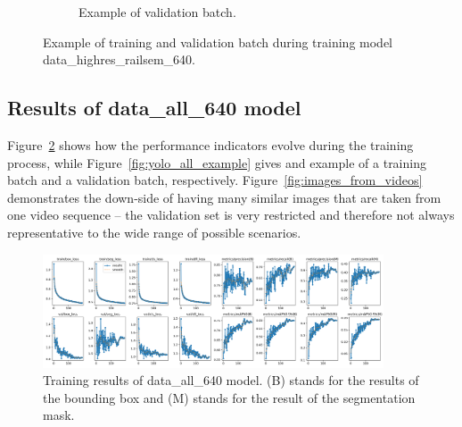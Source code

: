 \documentclass[Master,MDS,english]{BASE/twbook} %
\begin{document}
\begin{figure}
\begin{subfigure}{.5\textwidth}
  \caption{Example of validation batch. }
\end{subfigure}
\caption{Example of training and validation batch during training model data\_highres\_railsem\_640.}
\label{fig:yolo_highres_example}
\end{figure}



\subsection{Results of data\_all\_640 model}

Figure~\ref{fig:training_all} shows how the performance indicators evolve during the training process, while Figure~\ref{fig:yolo_all_example} gives and example of a training batch and a validation batch, respectively.
Figure~\ref{fig:images_from_videos} demonstrates the down-side of having many similar images that are taken from one video sequence -- the validation set is very restricted and therefore not always representative to the wide range of possible scenarios.


\begin{figure}[h]
\centering
\includegraphics[width=0.9\textwidth]{images/yolo/all/results}
\caption{Training results of data\_all\_640 model. (B) stands for the results of the bounding box and (M) stands for the result of the segmentation mask.}
\label{fig:training_all}
\end{figure}
\end{document}
